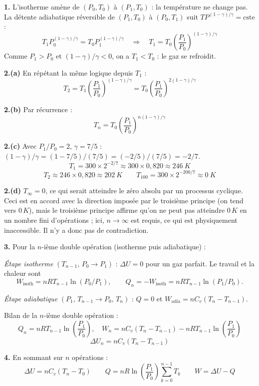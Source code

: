 \documentclass[12pt,a4paper]{article}
\begin{document}
\begin{boitecorrige}
\textbf{1.} L'isotherme amène de $(P_0, T_0)$ à $(P_1, T_0)$ : la température ne change pas. La détente adiabatique réversible de $(P_1, T_0)$ à $(P_0, T_1)$ suit $T P^{(1-\gamma)/\gamma} = \text{cste}$ :
\[
T_1 P_0^{(1-\gamma)/\gamma} = T_0 P_1^{(1-\gamma)/\gamma} \quad \Rightarrow \quad \boxed{T_1 = T_0\left(\frac{P_1}{P_0}\right)^{(1-\gamma)/\gamma}}
\]
Comme $P_1 > P_0$ et $(1-\gamma)/\gamma < 0$, on a $T_1 < T_0$ : le gaz se refroidit.

\textbf{2.(a)} En répétant la même logique depuis $T_1$ :
\[
T_2 = T_1\left(\frac{P_1}{P_0}\right)^{(1-\gamma)/\gamma} = T_0\left(\frac{P_1}{P_0}\right)^{2(1-\gamma)/\gamma}
\]

\textbf{2.(b)} Par récurrence :
\[
\boxed{T_n = T_0\left(\frac{P_1}{P_0}\right)^{n(1-\gamma)/\gamma}}
\]

\textbf{2.(c)} Avec $P_1/P_0 = 2$, $\gamma = 7/5$ : $(1-\gamma)/\gamma = (1-7/5)/(7/5) = (-2/5)/(7/5) = -2/7$.
\[
T_1 = 300\times 2^{-2/7} \approx 300\times 0{,}820 \approx \qty{246}{K}
\]
\[
T_2 \approx 246\times 0{,}820 \approx \qty{202}{K} \qquad T_{100} = 300\times 2^{-200/7} \approx \qty{0}{K}
\]

\textbf{2.(d)} $T_\infty = 0$, ce qui serait atteindre le zéro absolu par un processus cyclique. Ceci est en accord avec la direction imposée par le troisième principe (on tend vers $0\,K$), mais le troisième principe affirme qu'on ne peut pas atteindre $0\,K$ en un nombre fini d'opérations ; ici, $n\to\infty$ est requis, ce qui est physiquement inaccessible. Il n'y a donc pas de contradiction.

\textbf{3.} Pour la $n$-ième double opération (isotherme puis adiabatique) :

\emph{\'Etape isotherme} $(T_{n-1},\, P_0 \to P_1)$ :
$\Delta U = 0$ pour un gaz parfait.
Le travail et la chaleur sont
\[
W_{\text{isoth}} = nRT_{n-1}\ln(P_0/P_1),
\qquad
Q_n = -W_{\text{isoth}} = nRT_{n-1}\ln(P_1/P_0).
\]

\emph{\'Etape adiabatique} $(P_1,\, T_{n-1} \to P_0,\, T_n)$ :
$Q = 0$ et $W_{\text{adia}} = nC_v(T_n - T_{n-1})$.

Bilan de la $n$-ième double opération :
\[
Q_n = nRT_{n-1}\ln\!\left(\frac{P_1}{P_0}\right), \quad W_n = nC_v(T_n-T_{n-1}) - nRT_{n-1}\ln\!\left(\frac{P_1}{P_0}\right)
\]
\[
\Delta U_n = nC_v(T_n - T_{n-1})
\]

\textbf{4.} En sommant sur $n$ opérations :
\[
\Delta U = nC_v(T_n - T_0) \qquad Q = nR\ln\!\left(\frac{P_1}{P_0}\right)\sum_{k=0}^{n-1}T_k \qquad W = \Delta U - Q
\]
\end{boitecorrige}
\end{document}
